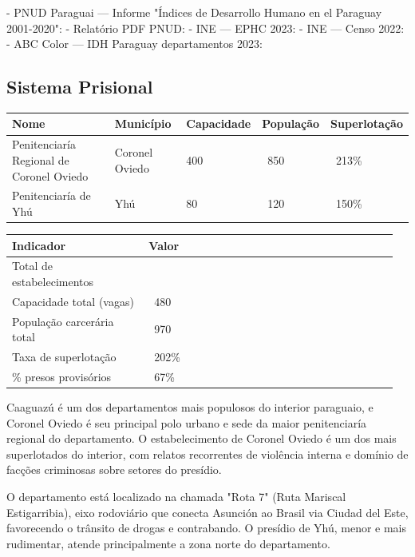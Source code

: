 - PNUD Paraguai --- Informe "Índices de Desarrollo Humano en el Paraguay 2001-2020": 
- Relatório PDF PNUD: 
- INE --- EPHC 2023: 
- INE --- Censo 2022: 
- ABC Color --- IDH Paraguay departamentos 2023: 


\subsection{Sistema Prisional}



{\small
\setlength{\tabcolsep}{3pt}
\renewcommand{\arraystretch}{1.12}
{\small
\begin{tabularx}{\linewidth}{lXXXX}
\toprule
Nome & Município & Capacidade & População & Superlotação \\
\midrule
Penitenciaría Regional de Coronel Oviedo & Coronel Oviedo & 400 & ~850 & ~213\% \\
Penitenciaría de Yhú & Yhú & 80 & ~120 & ~150\% \\
\bottomrule
\end{tabularx}
}
}


{\small
\setlength{\tabcolsep}{3pt}
\renewcommand{\arraystretch}{1.12}
\begin{tabularx}{\linewidth}{>{\raggedright\arraybackslash}p{0.34\linewidth} >{\raggedright\arraybackslash}p{0.62\linewidth}}
\toprule
Indicador & Valor \\
\midrule
Total de estabelecimentos & 2 \\
Capacidade total (vagas) & ~480 \\
População carcerária total & ~970 \\
Taxa de superlotação & ~202\% \\
\% presos provisórios & ~67\% \\
\bottomrule
\end{tabularx}
}


Caaguazú é um dos departamentos mais populosos do interior paraguaio, e Coronel Oviedo é seu principal polo urbano e sede da maior penitenciaría regional do departamento. O estabelecimento de Coronel Oviedo é um dos mais superlotados do interior, com relatos recorrentes de violência interna e domínio de facções criminosas sobre setores do presídio.

O departamento está localizado na chamada "Rota 7" (Ruta Mariscal Estigarribia), eixo rodoviário que conecta Asunción ao Brasil via Ciudad del Este, favorecendo o trânsito de drogas e contrabando. O presídio de Yhú, menor e mais rudimentar, atende principalmente a zona norte do departamento.

